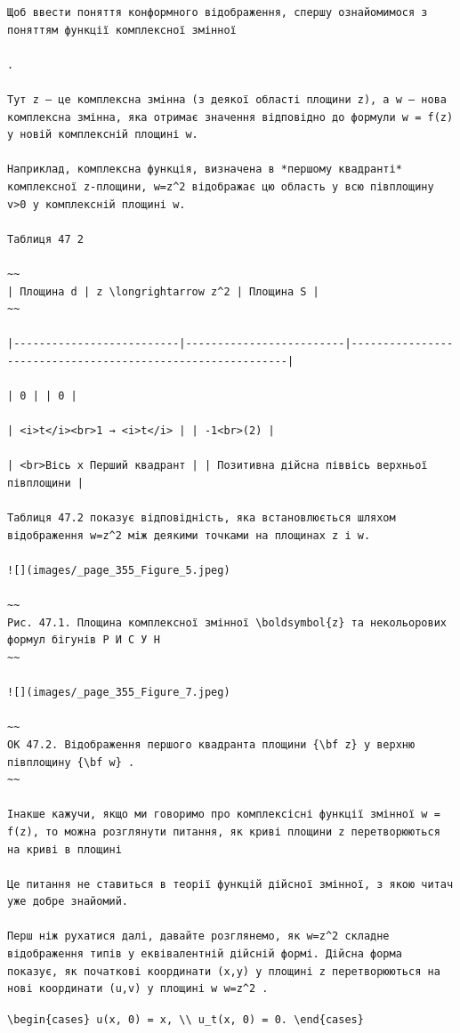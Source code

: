 \documentclass[
  ukrainian,
]{article}
\begin{document}
\begin{verbatim}
Щоб ввести поняття конформного відображення, спершу ознайомимося з поняттям функції комплексної змінної

.

Тут z — це комплексна змінна (з деякої області площини z), а w — нова комплексна змінна, яка отримає значення відповідно до формули w = f(z) у новій комплексній площині w.

Наприклад, комплексна функція, визначена в *першому квадранті* комплексної z-площини, w=z^2 відображає цю область у всю півплощину v>0 у комплексній площині w.

Таблиця 47 2

~~
| Площина d | z \longrightarrow z^2 | Площина S |
~~

|--------------------------|-------------------------|------------------------------------------------------------|

| 0 | | 0 |

| <i>t</i><br>1 → <i>t</i> | | -1<br>(2) |

| <br>Вісь x Перший квадрант | | Позитивна дійсна піввісь верхньої півплощини |

Таблиця 47.2 показує відповідність, яка встановлюється шляхом відображення w=z^2 між деякими точками на площинах z і w.

![](images/_page_355_Figure_5.jpeg)

~~
Рис. 47.1. Площина комплексної змінної \boldsymbol{z} та некольорових формул бігунів Р И С У Н
~~

![](images/_page_355_Figure_7.jpeg)

~~
ОК 47.2. Відображення першого квадранта площини {\bf z} у верхню півплощину {\bf w} .
~~

Інакше кажучи, якщо ми говоримо про комплексісні функції змінної w = f(z), то можна розглянути питання, як криві площини z перетворюються на криві в площині

Це питання не ставиться в теорії функцій дійсної змінної, з якою читач уже добре знайомий.

Перш ніж рухатися далі, давайте розглянемо, як w=z^2 складне відображення типів у еквівалентній дійсній формі. Дійсна форма показує, як початкові координати (x,y) у площині z перетворюються на нові координати (u,v) у площині w w=z^2 .
\end{verbatim}

\texttt{\textbackslash{}begin\{cases\}\ u(x,\ 0)\ =\ x,\ \textbackslash{}\textbackslash{}\ u\_t(x,\ 0)\ =\ 0.\ \textbackslash{}end\{cases\}}
\end{document}
